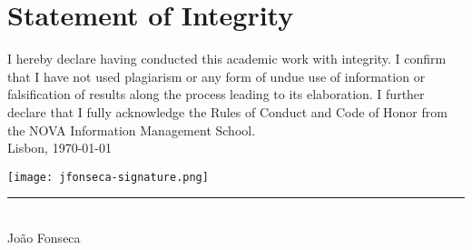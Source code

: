 \chapter*{Statement of Integrity}

I hereby declare having conducted this academic work with integrity. I confirm
that I have not used plagiarism or any form of undue use of information or
falsification of results along the process leading to its elaboration. I
further declare that I fully acknowledge the Rules of Conduct and Code of
Honor from the NOVA Information Management School.\\

Lisbon, \usdate\today
\vspace{-.5cm}

\begin{minipage}{0.3\textwidth}
    \centering 
    \texttt{[image: jfonseca-signature.png]}\\
    \vspace{-1cm}
    \rule{\textwidth}{.3pt}\\
    \large{João Fonseca}
\end{minipage}
\vspace{0.3cm}


